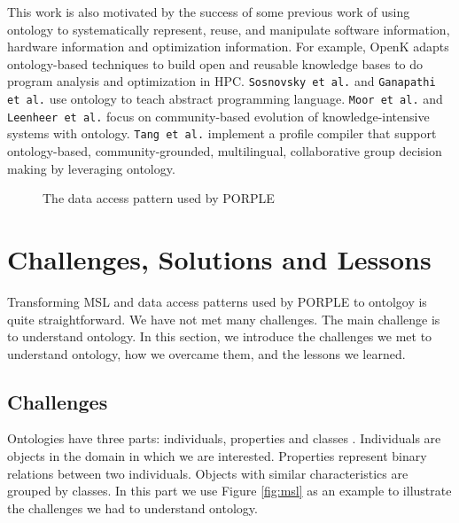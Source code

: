 \documentclass{sig-alternate}
\begin{document}
This work is also motivated by the success of some previous work of using ontology to systematically represent, reuse, and manipulate software information, hardware information and optimization information. For example, OpenK adapts ontology-based techniques to build open and reusable knowledge bases to do program analysis and optimization in HPC. \texttt{Sosnovsky et al.} \cite{work1} and \texttt{Ganapathi et al.} \cite{work2} use ontology to teach abstract programming language. \texttt{Moor et al.} \cite{ontology3} and \texttt{Leenheer et al.} \cite{ontology4} focus on community-based evolution of knowledge-intensive systems with ontology. \texttt{Tang et al.} \cite{ontology5} implement a profile compiler that support ontology-based, community-grounded, multilingual, collaborative group decision making by leveraging ontology. 

\begin{figure*}
\centering
{}
\caption{The memory specification of Tesla M2075 in MSL}
\label{fig:msl}
\end{figure*}

\begin{figure}
\centering
{}
\caption{The data access pattern used by PORPLE}
\label{fig:dap}
\end{figure}

\begin{figure*}
\centering
{}
\caption{Syntax of MSL}
\label{fig:property}
\end{figure*}

\section{Challenges, Solutions and Lessons}
Transforming MSL and data access patterns used by PORPLE to ontolgoy is quite straightforward. We have not met many challenges. The main challenge is to understand ontology. In this section, we introduce the challenges we met to understand ontology, how we overcame them, and the lessons we learned.

\subsection{Challenges}
Ontologies have three parts: individuals, properties and classes \cite{what1}. Individuals are objects in the domain in which we are interested. Properties represent binary relations between two individuals. Objects with similar characteristics are grouped by classes. In this part we use Figure \ref{fig:msl} as an example to illustrate the challenges we had to understand ontology. 
\end{document}
